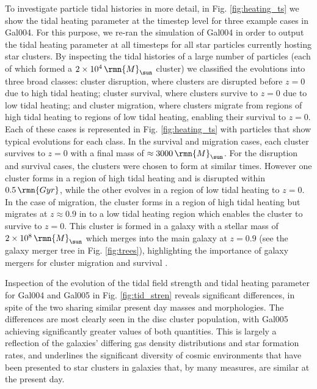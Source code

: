 \documentclass[fleqn,usenatbib]{mnras}
\newcommand\Msun{\,\rmn{M}_{\sun}}
\newcommand\Gyr{\,\rmn{Gyr}}
\begin{document}
To investigate particle tidal histories in more detail, in Fig. \ref{fig:heating_ts} we show the tidal heating parameter at the timestep level for three example cases in Gal004. For this purpose, we re-ran the simulation of Gal004 in order to output the tidal heating parameter at all timesteps for all star particles currently hosting star clusters. By inspecting the tidal histories of a large number of particles (each of which formed a $2\times 10^4 \Msun$ cluster) we classified the evolutions into three broad classes: cluster disruption, where clusters are disrupted before $z=0$ due to high tidal heating; cluster survival, where clusters survive to $z=0$ due to low tidal heating; and cluster migration, where clusters migrate from regions of high tidal heating to regions of low tidal heating, enabling their survival to $z=0$. Each of these cases is represented in Fig. \ref{fig:heating_ts} with particles that show typical evolutions for each class. In the survival and migration cases, each cluster survives to $z=0$ with a final mass of $\approx 3000 \Msun$. For the disruption and survival cases, the clusters were chosen to form at similar times. However one cluster forms in a region of high tidal heating and is disrupted within $0.5 \Gyr$, while the other evolves in a region of low tidal heating to $z=0$. In the case of migration, the cluster forms in a region of high tidal heating but migrates at $z\approx0.9$ in to a low tidal heating region which enables the cluster to survive to $z=0$. This cluster is formed in a galaxy with a stellar mass of $2\times10^8 \Msun$ which merges into the main galaxy at $z=0.9$ (see the galaxy merger tree in Fig. \ref{fig:trees}), highlighting the importance of galaxy mergers for cluster migration and survival \citep[as had been suggested by analytical models, cf.][]{Kruijssen_15}.

Inspection of the evolution of the tidal field strength and tidal heating parameter for Gal004 and Gal005 in Fig. \ref{fig:tid_stren} reveals significant differences, in spite of the two sharing similar present day masses and morphologies. The differences are most clearly seen in the disc cluster population, with Gal005 achieving significantly greater values of both quantities. This is largely a reflection of the galaxies' differing gas density distributions and star formation rates, and underlines the significant diversity of cosmic environments that have been presented to star clusters in galaxies that, by many measures, are similar at the present day.
\end{document}
